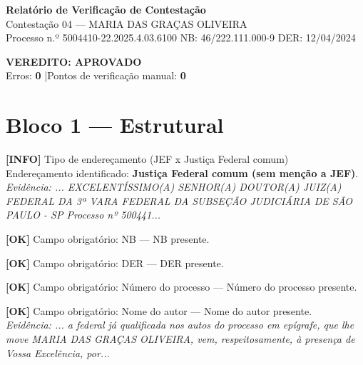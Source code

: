 \documentclass[12pt,a4paper]{article}
\newcommand{\statusOK}[1]{\textcolor{corOK}{\textbf{[OK]}} #1}
\newcommand{\statusINFO}[1]{\textcolor{corINFO}{\textbf{[INFO]}} #1}
\begin{document}
\begin{center}
  {\LARGE \textbf{Relatório de Verificação de Contestação}}\\[0.4em]
  {\large Contestação 04 --- MARIA DAS GRAÇAS OLIVEIRA}\\[0.2em]
  {\small Processo n.º 5004410-22.2025.4.03.6100 \quad NB: 46/222.111.000-9 \quad DER: 12/04/2024}
\end{center}

\vspace{0.5em}

\noindent\colorbox{corFundoAprovado}{%
  \begin{minipage}{\dimexpr\linewidth-2\fboxsep}
    \centering
    \vspace{0.3em}
    {\large \textcolor{corOK}{\textbf{VEREDITO: APROVADO}}}\\
    Erros: \textbf{0} \quad|\quad Pontos de verificação manual: \textbf{0}
    \vspace{0.3em}
  \end{minipage}%
}

\vspace{1em}


\section{Bloco 1 --- Estrutural}

\statusINFO{Tipo de endereçamento (JEF x Justiça Federal comum)}\\
Endereçamento identificado: \textbf{Justiça Federal comum (sem menção a JEF)}.\\
\textit{Evidência: ... EXCELENTÍSSIMO(A) SENHOR(A) DOUTOR(A) JUIZ(A) FEDERAL DA 3ª VARA FEDERAL DA SUBSEÇÃO JUDICIÁRIA DE SÃO PAULO - SP Processo nº 500441...}

\medskip
\statusOK{Campo obrigatório: NB} --- NB presente.

\medskip
\statusOK{Campo obrigatório: DER} --- DER presente.

\medskip
\statusOK{Campo obrigatório: Número do processo} --- Número do processo presente.

\medskip
\statusOK{Campo obrigatório: Nome do autor} --- Nome do autor presente.\\
\textit{Evidência: ... a federal já qualificada nos autos do processo em epígrafe, que lhe move MARIA DAS GRAÇAS OLIVEIRA, vem, respeitosamente, à presença de Vossa Excelência, por...}
\end{document}
